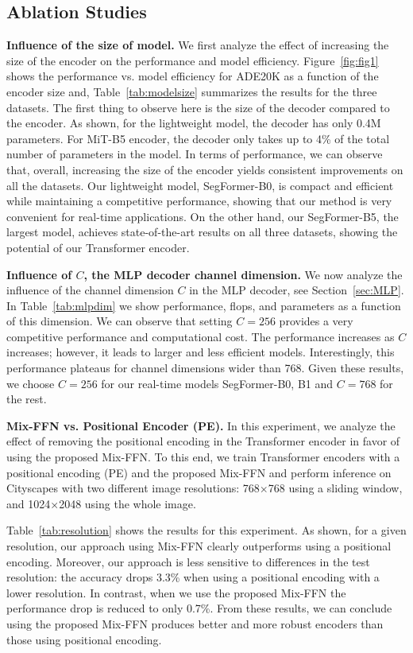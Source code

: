 \subsection{Ablation Studies}
\textbf{Influence of the size of model.} We first analyze the effect of increasing the size of the encoder on the performance and model efficiency.
Figure~\ref{fig:fig1} shows the performance vs. model efficiency for ADE20K as a function of the encoder size and, Table~\ref{tab:modelsize} summarizes the results for the three datasets. The first thing to observe here is the size of the decoder compared to the encoder. As shown, for the lightweight model, the decoder has only 0.4M parameters. For MiT-B5 encoder, the decoder only takes up to 4\% of the total number of parameters in the model. In terms of performance, we can observe that, overall, increasing the size of the encoder yields consistent improvements on all the datasets. Our lightweight model, SegFormer-B0, is compact and efficient while maintaining a competitive performance, showing that our method is very convenient for real-time applications.  On the other hand, our SegFormer-B5, the largest model, achieves state-of-the-art results on all three datasets, showing the potential of our Transformer encoder.

\textbf{Influence of $C$, the MLP decoder channel dimension.} We now analyze the influence of the channel dimension $C$ in the MLP decoder, see Section~\ref{sec:MLP}. In Table~\ref{tab:mlpdim} we show performance, flops, and parameters as a function of this dimension. We can observe that setting $C=256$ provides a very competitive performance and computational cost. The performance increases as $C$ increases; however, it leads to larger and less efficient models. Interestingly, this performance plateaus for channel dimensions wider than 768. Given these results, we choose $C=256$ for our real-time models SegFormer-B0, B1 and $C=768$ for the rest.

\textbf{Mix-FFN vs. Positional Encoder (PE).} In this experiment, we analyze the effect of removing the positional encoding in the Transformer encoder in favor of using the proposed Mix-FFN. To this end, we train Transformer encoders with a positional encoding (PE) and the proposed Mix-FFN and perform inference on Cityscapes with two different image resolutions: 768$\times$768 using a sliding window, and 1024$\times$2048 using the whole image.

Table~\ref{tab:resolution} shows the results for this experiment. As shown, for a given resolution, our approach using Mix-FFN clearly outperforms using a positional encoding. Moreover, our approach is less sensitive to differences in the test resolution: the accuracy drops 3.3\% when using a positional encoding with a lower resolution. In contrast, when we use the proposed Mix-FFN the performance drop is reduced to only 0.7\%. From these results, we can conclude using the proposed Mix-FFN produces better and more robust encoders than those using positional encoding. 

